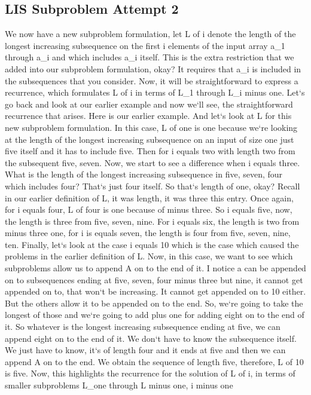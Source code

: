 \subsection{LIS  Subproblem Attempt 2}
We now have a new subproblem formulation, let L of i denote the length of the longest increasing subsequence on the first i elements of the input array a\_1 through a\_i and which includes a\_i itself.
This is the extra restriction that we added into our subproblem formulation, okay? It requires that a\_i is included in the subsequences that you consider.
Now, it will be straightforward to express a recurrence, which formulates L of i in terms of L\_1 through L\_i minus one.
Let`s go back and look at our earlier example and now we`ll see, the straightforward recurrence that arises.
Here is our earlier example.
And let`s look at L for this new subproblem formulation.
In this case, L of one is one because we`re looking at the length of the longest increasing subsequence on an input of size one just five itself and it has to include five.
Then for i equals two with length two from the subsequent five, seven.
Now, we start to see a difference when i equals three.
What is the length of the longest increasing subsequence in five, seven, four which includes four? That`s just four itself.
So that`s length of one, okay? Recall in our earlier definition of L, it was length, it was three this entry.
Once again, for i equals four, L of four is one because of minus three.
So i equals five, now, the length is three from five, seven, nine.
For i equals six, the length is two from minus three one, for i is equals seven, the length is four from five, seven, nine, ten.
Finally, let`s look at the case i equals 10 which is the case which caused the problems in the earlier definition of L\@.
Now, in this case, we want to see which subproblems allow us to append A on to the end of it.
I notice a can be appended on to subsequences ending at five, seven, four minus three but nine, it cannot get appended on to, that won`t be increasing.
It cannot get appended on to 10 either.
But the others allow it to be appended on to the end.
So, we`re going to take the longest of those and we`re going to add plus one for adding eight on to the end of it.
So whatever is the longest increasing subsequence ending at five, we can append eight on to the end of it.
We don`t have to know the subsequence itself.
We just have to know, it`s of length four and it ends at five and then we can append A on to the end.
We obtain the sequence of length five, therefore, L of 10 is five.
Now, this highlights the recurrence for the solution of L of i, in terms of smaller subproblems L\_one through L minus one, i minus one

